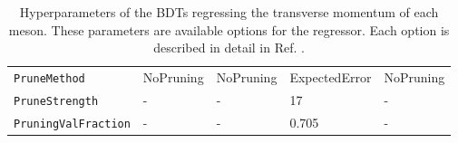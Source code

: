 \begin{table}[!ht]
\begin{tabular}{|l|C{2.45cm}|C{2.45cm}|C{2.45cm}|C{2.45cm}|}
        \verb+PruneMethod+          &NoPruning&NoPruning&ExpectedError&NoPruning    \\
        \verb+PruneStrength+        &-      &-      &17     &-    \\
        \verb+PruningValFraction+   &-      &-      &0.705 &-    \\
        \hline
        \end{tabular}
    \caption{Hyperparameters of the BDTs regressing the transverse momentum of each meson. These parameters are available options for the \usebox{\verbbox} regressor. Each option is described in detail in Ref. \cite{TMVA:2007ngy}.}
    \label{tab:hyperparameters_models}
\end{table}
